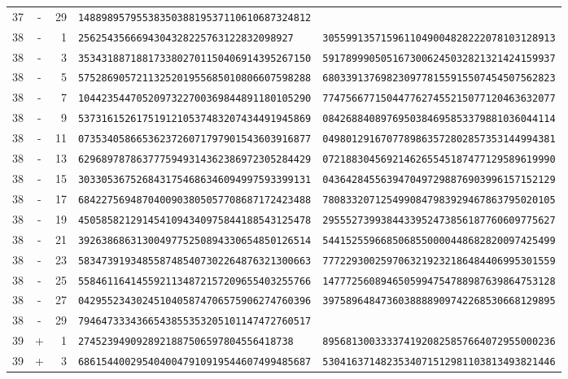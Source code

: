 \begin{longtable}{@{}rcrll@{}}
37&-&29&\texttt{1488989579553835038819537110610687324812}&\texttt{}\\
38&-&1&\texttt{2562543566694304328225763122832098927}&\texttt{3055991357159611049004828222078103128913}\\
38&-&3&\texttt{3534318871881733802701150406914395267150}&\texttt{5917899905051673006245032821321424159937}\\
38&-&5&\texttt{5752869057211325201955685010806607598288}&\texttt{6803391376982309778155915507454507562823}\\
38&-&7&\texttt{1044235447052097322700369844891180105290}&\texttt{7747566771504477627455215077120463632077}\\
38&-&9&\texttt{5373161526175191210537483207434491945869}&\texttt{0842688408976950384695853379881036044114}\\
38&-&11&\texttt{0735340586653623726071797901543603916877}&\texttt{0498012916707789863572802857353144994381}\\
38&-&13&\texttt{6296897878637775949314362386972305284429}&\texttt{0721883045692146265545187477129589619990}\\
38&-&15&\texttt{3033053675268431754686346094997593399131}&\texttt{0436428455639470497298876903996157152129}\\
38&-&17&\texttt{6842275694870400903805057708687172423488}&\texttt{7808332071254990847983929467863795020105}\\
38&-&19&\texttt{4505858212914541094340975844188543125478}&\texttt{2955527399384433952473856187760609775627}\\
38&-&21&\texttt{3926386863130049775250894330654850126514}&\texttt{5441525596685068550000448682820097425499}\\
38&-&23&\texttt{5834739193485587485407302264876321300663}&\texttt{7772293002597063219232186484406995301559}\\
38&-&25&\texttt{5584611641455921134872157209655403255766}&\texttt{1477725608946505994754788987639864753128}\\
38&-&27&\texttt{0429552343024510405874706575906274760396}&\texttt{3975896484736038888909742268530668129895}\\
38&-&29&\texttt{7946473334366543855353205101147472760517}&\texttt{}\\
39&+&1&\texttt{2745239490928921887506597804556418738}&\texttt{8956813003333741920825857664072955000236}\\
39&+&3&\texttt{6861544002954040047910919544607499485687}&\texttt{5304163714823534071512981103813493821446}\\

\end{longtable}
